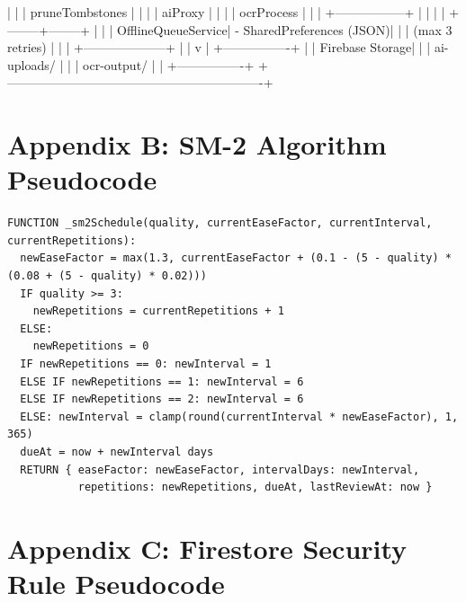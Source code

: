 \documentclass[12pt,a4paper,openany]{report}
\begin{document}
\begin{blockverbatim}
|           |                    | pruneTombstones |
|           |                    | aiProxy         |
|           |                    | ocrProcess      |
|           |                    +-----------------+
|           |                                       |
|  +--------+--------+                              |
|  | OfflineQueueService| - SharedPreferences (JSON)|
|  |  (max 3 retries)   |                            |
|  +--------------------+                            |
|                                                     v
|                                          +----------------+
|                                          | Firebase Storage|
|                                          | ai-uploads/    |
|                                          | ocr-output/    |
|                                          +----------------+
+-------------------------------------------------------------+
\end{blockverbatim}

\chapter*{Appendix B: SM-2 Algorithm Pseudocode}

\begin{verbatim}
FUNCTION _sm2Schedule(quality, currentEaseFactor, currentInterval, currentRepetitions):
  newEaseFactor = max(1.3, currentEaseFactor + (0.1 - (5 - quality) * (0.08 + (5 - quality) * 0.02)))
  IF quality >= 3:
    newRepetitions = currentRepetitions + 1
  ELSE:
    newRepetitions = 0
  IF newRepetitions == 0: newInterval = 1
  ELSE IF newRepetitions == 1: newInterval = 6
  ELSE IF newRepetitions == 2: newInterval = 6
  ELSE: newInterval = clamp(round(currentInterval * newEaseFactor), 1, 365)
  dueAt = now + newInterval days
  RETURN { easeFactor: newEaseFactor, intervalDays: newInterval,
           repetitions: newRepetitions, dueAt, lastReviewAt: now }
\end{verbatim}

\chapter*{Appendix C: Firestore Security Rule Pseudocode}
\end{document}
